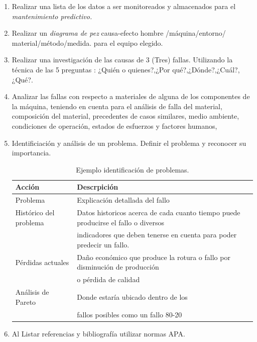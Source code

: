 \documentclass[a4paper]{article}
\begin{document}
\begin{enumerate}
    \item Realizar una lista de los datos a ser monitoreados y almacenados  para el \textit{mantenimiento predictivo.}
    \item Realizar un \textit{diagrama de pez}  causa-efecto hombre /máquina/entorno/ material/método/medida. para el equipo elegido.
   \item Realizar una investigación de las causas de 3 (Tres) fallas. Utilizando la técnica de las 5 preguntas : ¿Quién o quienes?,¿Por qué?,¿Dónde?,¿Cuál?,¿Qué?.
    \item Analizar las fallas con respecto a materiales de alguna de los componentes de la máquina, teniendo en cuenta para el análisis de falla del material, composición del material, precedentes de casos similares, medio ambiente, condiciones de operación, estados de esfuerzos y factores humanos,
\item Identificiación y análisis de un problema.
Definir el problema y reconocer su importancia.
  \begin{table}[htbp]
\begin{center}
\begin{tabular}{|l|l|}
\hline
Acción & Descrpición  \\
\hline \hline
Problema & Explicación detallada del fallo \\ \hline
Histórico del problema & Datos historicos acerca de cada cuanto tiempo puede producirse el fallo o diversos\\
 & indicadores que deben tenerse en cuenta para poder predecir un fallo. \\ \hline
Pérdidas actuales & Daño económico que produce la rotura o fallo por disminución de producción\\
& o pérdida de calidad \\ \hline
Análisis de Pareto & Donde estaría ubicado dentro de los \\
& fallos posibles como un fallo 80-20 \\ \hline
\end{tabular}
\caption{Ejemplo identificación de problemas.}
\label{tabla:sencilla}
\end{center}
\end{table}

\item Al Listar referencias y bibliografía utilizar normas APA.

\end{enumerate}
\end{document}
